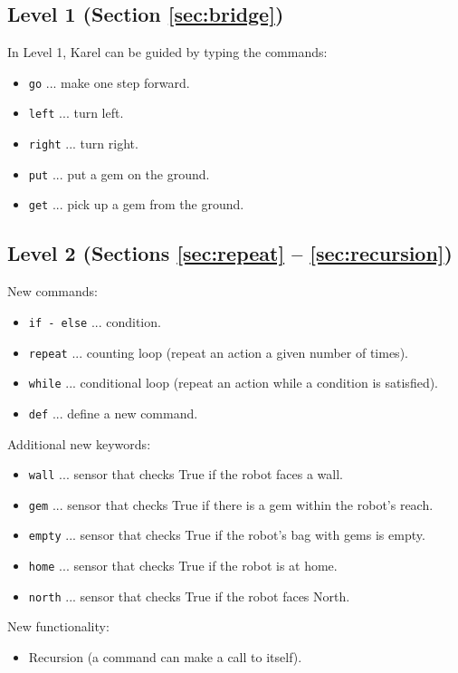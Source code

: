 \documentclass[article,A4,12pt]{llncs}
\begin{document}
\subsection{Level 1 (Section \ref{sec:bridge})}

In Level 1, Karel can be guided by typing the commands:
\begin{itemize}
\item {\tt go} ... make one step forward.
\item {\tt left} ... turn left.
\item {\tt right} ... turn right.
\item {\tt put} ... put a gem on the ground.
\item {\tt get} ... pick up a gem from the ground.
\end{itemize}

\subsection{Level 2 (Sections \ref{sec:repeat} -- \ref{sec:recursion})}

New commands:
\begin{itemize}
\item {\tt if - else} ... condition.
\item {\tt repeat} ... counting loop (repeat an action a given number of times).
\item {\tt while} ... conditional loop (repeat an action while a condition is satisfied).
\item {\tt def} ... define a new command.
\end{itemize}
Additional new keywords:
\begin{itemize}
\item {\tt wall} ... sensor that checks True if the robot faces a wall.
\item {\tt gem} ... sensor that checks True if there is a gem within the robot's reach.
\item {\tt empty} ... sensor that checks True if the robot's bag with gems is empty.
\item {\tt home} ... sensor that checks True if the robot is at home.
\item {\tt north} ... sensor that checks True if the robot faces North.
\end{itemize}
New functionality:
\begin{itemize}
\item Recursion (a command can make a call to itself).
\end{itemize}
\end{document}
